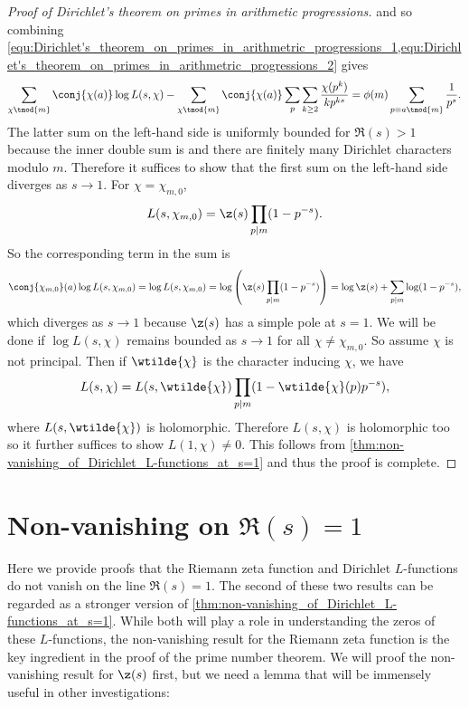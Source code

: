 \begin{proof}[Proof of Dirichlet's theorem on primes in arithmetic progressions]
          and so combining \cref{equ:Dirichlet's_theorem_on_primes_in_arithmetric_progressions_1,equ:Dirichlet's_theorem_on_primes_in_arithmetric_progressions_2} gives
          \[
            \sum_{\chi \tmod{m}}\conj{\chi(a)}\log L(s,\chi)-\sum_{\chi \tmod{m}}\conj{\chi(a)}\sum_{p}\sum_{k \ge 2}\frac{\chi(p^{k})}{kp^{ks}} = \phi(m)\sum_{p \equiv{a} \tmod{m}}\frac{1}{p^{s}}.
          \]
          The latter sum on the left-hand side is uniformly bounded for $\Re(s) > 1$ because the inner double sum is and there are finitely many Dirichlet characters modulo $m$. Therefore it suffices to show that the first sum on the left-hand side diverges as $s \to 1$. For $\chi = \chi_{m,0}$,
          \[
            L(s,\chi_{m,0}) = \z(s)\prod_{p \mid m}(1-p^{-s}).
          \]
          So the corresponding term in the sum is
          \[
            \conj{\chi_{m,0}}(a)\log L(s,\chi_{m,0}) = \log L(s,\chi_{m,0}) = \log\left(\z(s)\prod_{p \mid m}(1-p^{-s})\right) = \log\z(s)+\sum_{p \mid m}\log(1-p^{-s}),
          \]
          which diverges as $s \to 1$ because $\z(s)$ has a simple pole at $s = 1$. We will be done if $\log L(s,\chi)$ remains bounded as $s \to 1$ for all $\chi \neq \chi_{m,0}$. So assume $\chi$ is not principal. Then if $\wtilde{\chi}$ is the character inducing $\chi$, we have
          \[
            L(s,\chi) = L(s,\wtilde{\chi})\prod_{p \mid m}(1-\wtilde{\chi}(p)p^{-s}),
          \]
          where $L(s,\wtilde{\chi})$ is holomorphic. Therefore $L(s,\chi)$ is holomorphic too so it further suffices to show $L(1,\chi) \neq 0$. This follows from \cref{thm:non-vanishing_of_Dirichlet_L-functions_at_s=1} and thus the proof is complete.
      \end{proof}
    \section{Non-vanishing on \texorpdfstring{$\Re(s) = 1$}{\Re(s) = 1}}
      Here we provide proofs that the Riemann zeta function and Dirichlet $L$-functions do not vanish on the line $\Re(s) = 1$. The second of these two results can be regarded as a stronger version of \cref{thm:non-vanishing_of_Dirichlet_L-functions_at_s=1}. While both will play a role in understanding the zeros of these $L$-functions, the non-vanishing result for the Riemann zeta function is the key ingredient in the proof of the prime number theorem. We will proof the non-vanishing result for $\z(s)$ first, but we need a lemma that will be immensely useful in other investigations:


